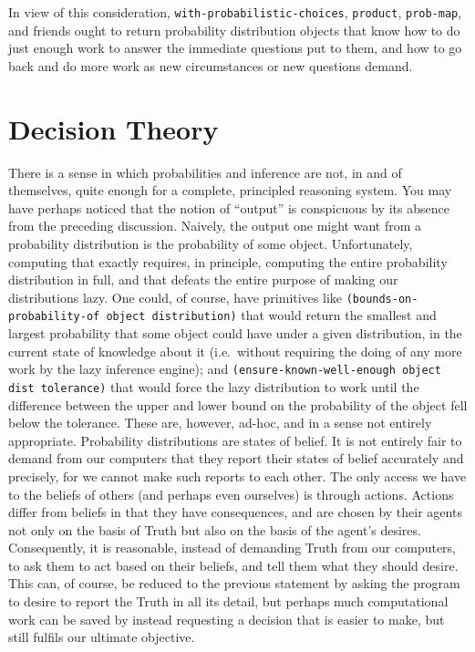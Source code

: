 \documentclass[12pt]{article}
\newcommand{\code}[1]{\texttt{#1}}
\begin{document}
In view of this consideration, \code{with-probabilistic-choices},
\code{product}, \code{prob-map}, and friends ought to return
probability distribution objects that know how to do just enough work
to answer the immediate questions put to them, and how to go back and
do more work as new circumstances or new questions demand.

\section{Decision Theory}
\label{decision}

There is a sense in which probabilities and inference are not, in and
of themselves, quite enough for a complete, principled reasoning
system.  You may have perhaps noticed that the notion of ``output'' is
conspicuous by its absence from the preceding discussion.  Naively,
the output one might want from a probability distribution is the
probability of some object.  Unfortunately, computing that exactly
requires, in principle, computing the entire probability distribution
in full, and that defeats the entire purpose of making our
distributions lazy.  One could, of course, have primitives like
\code{(bounds-on-probability-of object distribution)} that would return the
smallest and largest probability that some object could have under a
given distribution, in the current state of knowledge about it
(i.e.\ without requiring the doing of any more work by the lazy
inference engine); and \code{(ensure-known-well-enough object dist
tolerance)} that would force the lazy distribution to work until the
difference between the upper and lower bound on the probability of the
object fell below the tolerance.  These are, however, ad-hoc, and in a
sense not entirely appropriate.  Probability distributions are states
of belief.  It is not entirely fair to demand from our computers that
they report their states of belief accurately and precisely, for we
cannot make such reports to each other.  The only access we have to
the beliefs of others (and perhaps even ourselves) is through 
actions.  Actions differ from beliefs in that they have consequences,
and are chosen by their agents not only on the basis of Truth but also
on the basis of the agent's desires.  Consequently, it is reasonable,
instead of demanding Truth from our computers, to ask them to act
based on their beliefs, and tell them what they should desire.  This
can, of course, be reduced to the previous statement by asking the
program to desire to report the Truth in all its detail, but perhaps
much computational work can be saved by instead requesting a decision
that is easier to make, but still fulfils our ultimate objective.
\end{document}

